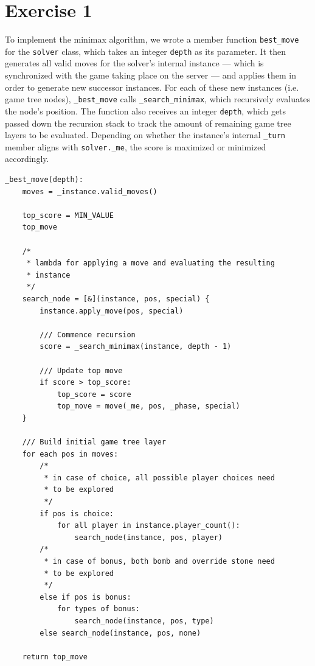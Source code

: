 \section{Exercise 1}
To implement the minimax algorithm, we wrote a member function \texttt{best\_move} for the \texttt{solver} class, which takes an integer \texttt{depth} as its parameter. It then generates all valid moves for the solver's internal instance --- which is synchronized with the game taking place on the server --- and applies them in order to generate new successor instances. For each of these new instances (i.e. game tree nodes), \texttt{\_best\_move} calls \texttt{\_search\_minimax}, which recursively evaluates the node's position. The function also receives an integer \texttt{depth}, which gets passed down the recursion stack to track the amount of remaining game tree layers to be evaluated. Depending on whether the instance's internal \texttt{\_turn} member aligns with \texttt{solver.\_me}, the score is maximized or minimized accordingly. \\
\begin{lstlisting}
_best_move(depth):
    moves = _instance.valid_moves()

    top_score = MIN_VALUE
    top_move

    /* 
     * lambda for applying a move and evaluating the resulting
     * instance
     */
    search_node = [&](instance, pos, special) {
        instance.apply_move(pos, special)

        /// Commence recursion
        score = _search_minimax(instance, depth - 1)

        /// Update top move
        if score > top_score:
            top_score = score
            top_move = move(_me, pos, _phase, special)
    }

    /// Build initial game tree layer
    for each pos in moves:
        /*
         * in case of choice, all possible player choices need
         * to be explored
         */
        if pos is choice:
            for all player in instance.player_count():
                search_node(instance, pos, player)
        /*
         * in case of bonus, both bomb and override stone need
         * to be explored
         */
        else if pos is bonus:
            for types of bonus:
                search_node(instance, pos, type)
        else search_node(instance, pos, none)
    
    return top_move
\end{lstlisting}
